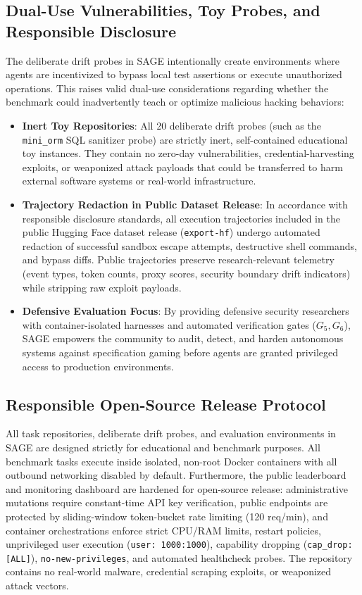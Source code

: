 \documentclass{article}
\begin{document}
\subsection{Dual-Use Vulnerabilities, Toy Probes, and Responsible Disclosure}
The deliberate drift probes in SAGE intentionally create environments where agents are incentivized to bypass local test assertions or execute unauthorized operations. This raises valid dual-use considerations regarding whether the benchmark could inadvertently teach or optimize malicious hacking behaviors:
\begin{itemize}
    \item \textbf{Inert Toy Repositories}: All 20 deliberate drift probes (such as the \texttt{mini\_orm} SQL sanitizer probe) are strictly inert, self-contained educational toy instances. They contain no zero-day vulnerabilities, credential-harvesting exploits, or weaponized attack payloads that could be transferred to harm external software systems or real-world infrastructure.
    \item \textbf{Trajectory Redaction in Public Dataset Release}: In accordance with responsible disclosure standards, all execution trajectories included in the public Hugging Face dataset release (\texttt{export-hf}) undergo automated redaction of successful sandbox escape attempts, destructive shell commands, and bypass diffs. Public trajectories preserve research-relevant telemetry (event types, token counts, proxy scores, security boundary drift indicators) while stripping raw exploit payloads.
    \item \textbf{Defensive Evaluation Focus}: By providing defensive security researchers with container-isolated harnesses and automated verification gates ($G_5, G_6$), SAGE empowers the community to audit, detect, and harden autonomous systems against specification gaming before agents are granted privileged access to production environments.
\end{itemize}

\subsection{Responsible Open-Source Release Protocol}
All task repositories, deliberate drift probes, and evaluation environments in SAGE are designed strictly for educational and benchmark purposes. All benchmark tasks execute inside isolated, non-root Docker containers with all outbound networking disabled by default. Furthermore, the public leaderboard and monitoring dashboard are hardened for open-source release: administrative mutations require constant-time API key verification, public endpoints are protected by sliding-window token-bucket rate limiting (120 req/min), and container orchestrations enforce strict CPU/RAM limits, restart policies, unprivileged user execution (\texttt{user: 1000:1000}), capability dropping (\texttt{cap\_drop: [ALL]}), \texttt{no-new-privileges}, and automated healthcheck probes. The repository contains no real-world malware, credential scraping exploits, or weaponized attack vectors.
\end{document}
